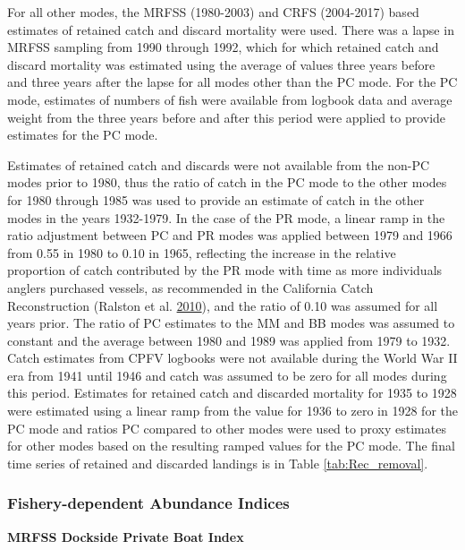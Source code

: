 \documentclass[12pt,]{article}
\begin{document}
For all other modes, the MRFSS (1980-2003) and CRFS (2004-2017) based
estimates of retained catch and discard mortality were used. There was a
lapse in MRFSS sampling from 1990 through 1992, which for which retained
catch and discard mortality was estimated using the average of values
three years before and three years after the lapse for all modes other
than the PC mode. For the PC mode, estimates of numbers of fish were
available from logbook data and average weight from the three years
before and after this period were applied to provide estimates for the
PC mode.

Estimates of retained catch and discards were not available from the
non-PC modes prior to 1980, thus the ratio of catch in the PC mode to
the other modes for 1980 through 1985 was used to provide an estimate of
catch in the other modes in the years 1932-1979. In the case of the PR
mode, a linear ramp in the ratio adjustment between PC and PR modes was
applied between 1979 and 1966 from 0.55 in 1980 to 0.10 in 1965,
reflecting the increase in the relative proportion of catch contributed
by the PR mode with time as more individuals anglers purchased vessels,
as recommended in the California Catch Reconstruction (Ralston et al.
\protect\hyperlink{ref-Ralston2010}{2010}), and the ratio of 0.10 was
assumed for all years prior. The ratio of PC estimates to the MM and BB
modes was assumed to constant and the average between 1980 and 1989 was
applied from 1979 to 1932. Catch estimates from CPFV logbooks were not
available during the World War II era from 1941 until 1946 and catch was
assumed to be zero for all modes during this period. Estimates for
retained catch and discarded mortality for 1935 to 1928 were estimated
using a linear ramp from the value for 1936 to zero in 1928 for the PC
mode and ratios PC compared to other modes were used to proxy estimates
for other modes based on the resulting ramped values for the PC mode.
The final time series of retained and discarded landings is in Table
\ref{tab:Rec_removal}.

\subsubsection{Fishery-dependent Abundance
Indices}\label{fishery-dependent-abundance-indices}

\textbf{MRFSS Dockside Private Boat Index}
\end{document}
